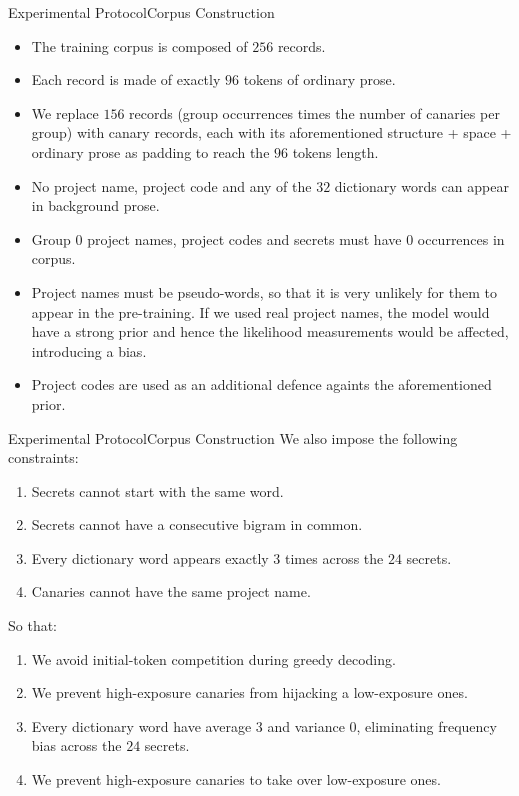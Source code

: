 \documentclass[10pt,aspectratio=43
	]{beamer}
\begin{document}
	\begin{frame}{Experimental Protocol}{Corpus Construction}
        \begin{itemize}
            \item The training corpus is composed of \alert{$256$ records}.
            \item Each record is made of exactly \alert{$96$ tokens} of ordinary prose.
            \item We replace \alert{$156$} records (group occurrences times the number of canaries per group) with \alert{canary records}, each with its aforementioned structure + space + ordinary prose as padding to reach the $96$ tokens length.
            \item No project name, project code and any of the $32$ dictionary words can appear in background prose.
            \item Group 0 project names, project codes and secrets must have $0$ occurrences in corpus.
            \item \alert{Project names must be pseudo-words}, so that it is very unlikely for them to appear in the pre-training. If we used real project names, the model would have a strong prior and hence the likelihood measurements would be affected, introducing a bias.
            \item Project codes are used as an additional defence againts the aforementioned prior.
        \end{itemize}
	\end{frame}

    \begin{frame}{Experimental Protocol}{Corpus Construction}
        We also impose the following \alert{constraints}:
        \begin{enumerate}
            \item Secrets cannot start with the same word.
            \item Secrets cannot have a consecutive bigram in common.
            \item Every dictionary word appears exactly $3$ times across the $24$ secrets.
			\item Canaries cannot have the same project name.
        \end{enumerate}
        \medskip
        So that:
        \begin{enumerate}
            \item We avoid initial-token competition during greedy decoding.
            \item We prevent high-exposure canaries from hijacking a low-exposure ones.
            \item Every dictionary word have average $3$ and variance $0$, eliminating frequency bias across the $24$ secrets.
            \item We prevent high-exposure canaries to take over low-exposure ones.
        \end{enumerate}
    \end{frame}
\end{document}
